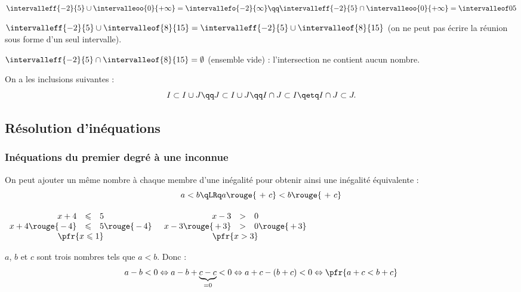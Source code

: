 \documentclass[10pt,openright,twoside,french]{book}
\begin{document}
\begin{Exemple}[s]
$\intervalleff{-2}{5} \cup \intervalleoo{0}{+\infty} = \intervallefo{-2}{\infty} \qq \intervalleff{-2}{5} \cap \intervalleoo{0}{+\infty} = \intervalleof 0 5$ \medskip

$\intervalleff{-2}{5} \cup \intervalleof{8}{15} = \intervalleff{-2}{5} \cup \intervalleof{8}{15}$ (on ne peut pas écrire la réunion sous forme d'un seul intervalle).\medskip

$\intervalleff{-2}{5} \cap \intervalleof{8}{15} = \emptyset$ (ensemble vide) : l'intersection ne contient aucun nombre.
\end{Exemple}\medskip

\begin{Rmq}
    On a les inclusions suivantes :
    \[I \subset I \cup J \qq J \subset I \cup J \qq I \cap J \subset I \qetq I \cap J \subset J.\]
\end{Rmq}

\subsection{Résolution d'inéquations}
\subsubsection{Inéquations du premier degré à une inconnue}

\begin{Prop}
    On peut ajouter un même nombre à chaque membre d'une inégalité pour obtenir ainsi une inégalité équivalente :
    \[a < b \qLRq a \rouge{\ +\ c } < b \rouge{\ +\ c}\]
\end{Prop}

\begin{Exemple}[s]
    $\begin{array}[t]{rcl}
        x + 4 & \leqslant & 5 \\
        x + 4 \rouge{\,-\,4} & \leqslant & 5 \rouge{\,-\,4} \\
        \multicolumn{3}{c}{\pfr{x\leqslant 1}}
    \end{array}$\quad
    $\begin{array}[t]{rcl}
        x - 3 & > & 0 \\
        x -3 \rouge{\,+\,3} & > & 0 \rouge{\,+\,3} \\
        \multicolumn{3}{c}{\pfr{x > 3}}
    \end{array}$
\end{Exemple}

\begin{Demo}
    $a$, $b$ et $c$ sont trois nombres tels que $a < b$. Donc :
    \[a - b < 0 \Leftrightarrow a - b + \underbrace{c - c}_{= 0} < 0 \Leftrightarrow a + c - (b + c) < 0 \Leftrightarrow \pfr{a + c < b + c}\]
\end{Demo}
\end{document}
